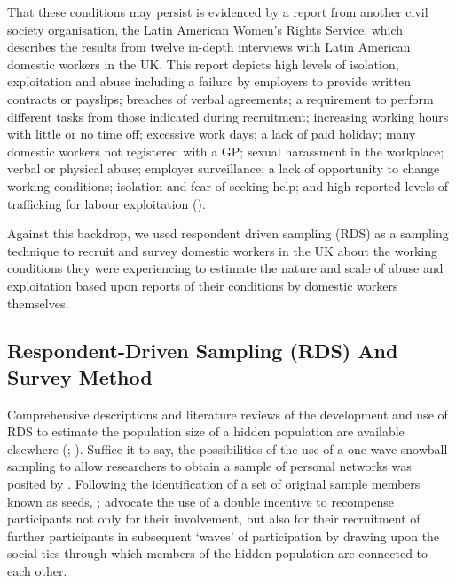 \documentclass[
  12pt,
  letterpaper,
  DIV=11,
  numbers=noendperiod]{scrartcl}
\theoremstyle{plain}
\theoremstyle{definition}
\begin{document}
That these conditions may persist is evidenced by a report from another
civil society organisation, the Latin American Women's Rights Service,
which describes the results from twelve in-depth interviews with Latin
American domestic workers in the UK. This report depicts high levels of
isolation, exploitation and abuse including a failure by employers to
provide written contracts or payslips; breaches of verbal agreements; a
requirement to perform different tasks from those indicated during
recruitment; increasing working hours with little or no time off;
excessive work days; a lack of paid holiday; many domestic workers not
registered with a GP; sexual harassment in the workplace; verbal or
physical abuse; employer surveillance; a lack of opportunity to change
working conditions; isolation and fear of seeking help; and high
reported levels of trafficking for labour exploitation
(\textcite{latin_american_womens_rights_service_behind_2023}).

Against this backdrop, we used respondent driven sampling (RDS) as a
sampling technique to recruit and survey domestic workers in the UK
about the working conditions they were experiencing to estimate the
nature and scale of abuse and exploitation based upon reports of their
conditions by domestic workers themselves.

\subsection{Respondent-Driven Sampling (RDS) And Survey
Method}\label{respondent-driven-sampling-rds-and-survey-method}

Comprehensive descriptions and literature reviews of the development and
use of RDS to estimate the population size of a hidden population are
available elsewhere (\textcite{heckathorn_comment_2011};
\textcite{gile_methods_2018}). Suffice it to say, the possibilities of
the use of a one-wave snowball sampling to allow researchers to obtain a
sample of personal networks was posited by
\textcite{frank_estimating_1994}. Following the identification of a set
of original sample members known as seeds,
\textcite{heckathorn_respondent-driven_1997};
\textcite{heckathorn_respondent-driven_2002} advocate the use of a
double incentive to recompense participants not only for their
involvement, but also for their recruitment of further participants in
subsequent `waves' of participation by drawing upon the social ties
through which members of the hidden population are connected to each
other.
\end{document}
